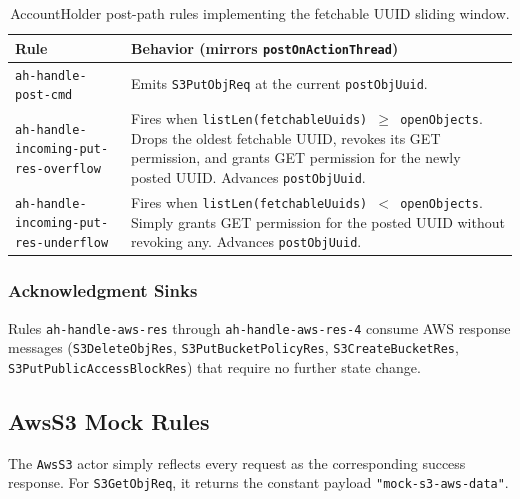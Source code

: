 \documentclass[11pt]{article}
\begin{document}
\begin{table}[H]
\centering
\small
\begin{tabular}{@{}lp{8.5cm}@{}}
\toprule
\textbf{Rule} & \textbf{Behavior (mirrors \texttt{postOnActionThread})} \\
\midrule
\texttt{ah-handle-post-cmd}
  & Emits \texttt{S3PutObjReq} at the current \texttt{postObjUuid}. \\
\texttt{ah-handle-incoming-put-res-overflow}
  & Fires when \texttt{listLen(fetchableUuids) $\geq$ openObjects}.  Drops the oldest fetchable UUID, revokes its GET permission, and grants GET permission for the newly posted UUID.  Advances \texttt{postObjUuid}. \\
\texttt{ah-handle-incoming-put-res-underflow}
  & Fires when \texttt{listLen(fetchableUuids) $<$ openObjects}.  Simply grants GET permission for the posted UUID without revoking any.  Advances \texttt{postObjUuid}. \\
\bottomrule
\end{tabular}
\caption{AccountHolder post-path rules implementing the fetchable UUID sliding window.}
\end{table}

\subsubsection{Acknowledgment Sinks}

Rules \texttt{ah-handle-aws-res} through \texttt{ah-handle-aws-res-4}
consume AWS response messages (\texttt{S3DeleteObjRes},
\texttt{S3PutBucketPolicyRes}, \texttt{S3CreateBucketRes},
\texttt{S3PutPublicAccessBlockRes}) that require no further state
change.

\subsection{AwsS3 Mock Rules}

The \texttt{AwsS3} actor simply reflects every request as the
corresponding success response.  For \texttt{S3GetObjReq}, it returns
the constant payload \texttt{"mock-s3-aws-data"}.
\end{document}
